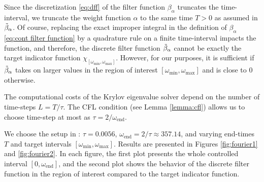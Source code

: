 \documentclass[a4paper,11pt,bibliography=totoc,listof=totoc,headinclude=true,cleardoublepage=empty,oneside]{scrbook}
\newcommand{\dff}{\Tilde{\beta}_\alpha}
\newcommand{\e}{\mathrm{end}}
\begin{document}
Since the discretization \eqref{eq:dff} of the filter function $\beta_\alpha$ truncates the time-interval, we truncate the weight function $\alpha$ to the same time $T>0$ as assumed in $\dff$. Of course, replacing the exact improper integral in the definition of $\beta_\alpha$ \eqref{eq:cont filter function} by a quadrature rule on a finite time-interval impacts the function, and therefore, the discrete filter function $\dff$ cannot be exactly the target indicator function $\chi_{\left[\omega_{\min}, \omega_{\max}\right]}$. However, for our purposes, it is sufficient if $\dff$ takes on larger values in the region of interest $\left[\omega_{\min}, \omega_{\max}\right]$ and is close to 0 otherwise.

The computational costs of the Krylov eigenvalue solver depend on the number of time-steps $L=T/\tau$. The CFL condition (see Lemma \ref{lemma:cfl}) allows us to choose time-step at most as $\tau = 2/\omega_{\e}$.

We choose the setup in \cite[section 3.1.2]{nannen}: $\tau = 0.0056$, $\omega_\e = 2/\tau \approx 357.14$, and varying end-times $T$ and target intervals $\left[\omega_{\min}, \omega_{\max}\right]$. Results are presented in Figures \ref{fig:fourier1} and \ref{fig:fourier2}. In each figure, the first plot presents the whole controlled interval $\left[0, \omega_\e\right]$, and the second plot shows the behavior of the discrete filter function in the region of interest compared to the target indicator function.
\end{document}
